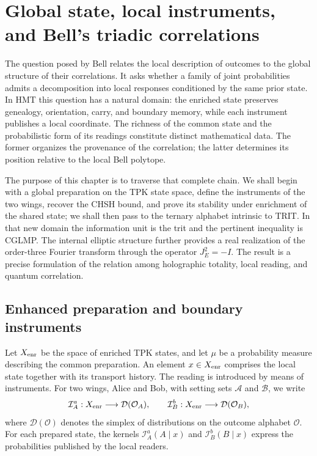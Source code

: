 \section{Global state, local instruments, and Bell's triadic correlations}
\label{chap:bell-local-global}

The question posed by Bell \cite{Bell1964} relates the local description of
outcomes to the global structure of their correlations. It asks whether a family of
joint probabilities admits a decomposition into local responses conditioned by the
same prior state. In HMT this question has a natural domain: the enriched state preserves
genealogy, orientation, carry, and boundary memory, while each
instrument publishes a local coordinate. The richness of the common state and the
probabilistic form of its readings constitute distinct mathematical data. The former
organizes the provenance of the correlation; the latter determines its position relative
to the local Bell polytope.

The purpose of this chapter is to traverse that complete chain. We shall begin with a
global preparation on the TPK state space, define the instruments of
the two wings, recover the CHSH bound, and prove its stability under
enrichment of the shared state; we shall then pass to the ternary alphabet intrinsic
to TRIT. In that new
domain the information unit is the trit and the pertinent inequality is CGLMP. The
internal elliptic structure further provides a real realization of the
order-three Fourier transform through the operator \(J_E^2=-I\). The result is
a precise formulation of the relation among holographic totality, local reading, and
quantum correlation.

\subsection{Enhanced preparation and boundary instruments}

Let \(X_{\rm enr}\) be the space of enriched TPK states, and let
\(\mu\) be a probability measure describing the common preparation. An element
\(x\in X_{\rm enr}\) comprises the local state together with its transport history.
The reading is introduced by means of instruments. For two
wings, Alice and Bob, with setting sets \(\mathcal A\) and \(\mathcal B\),
we write
\[
 \mathcal I_A^a:X_{\rm enr}\longrightarrow\mathcal D(\mathcal O_A),
 \qquad
 \mathcal I_B^b:X_{\rm enr}\longrightarrow\mathcal D(\mathcal O_B),
\]
where \(\mathcal D(\mathcal O)\) denotes the simplex of distributions on the
outcome alphabet \(\mathcal O\). For each prepared state, the kernels
\(\mathcal I_A^a(A\mid x)\) and \(\mathcal I_B^b(B\mid x)\) express the
probabilities published by the local readers.

